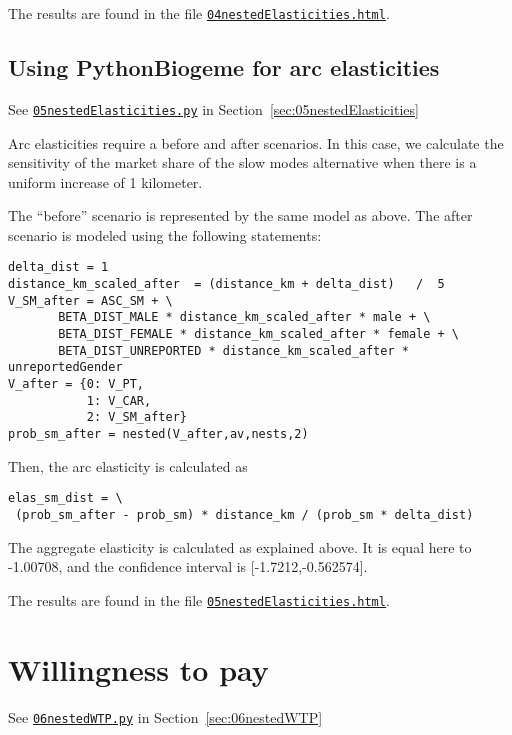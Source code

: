 \documentclass[12pt,a4paper]{article}
\begin{document}
The results are found in the file \href{http://biogeme.epfl.ch/examples/indicators/python/04nestedElasticities.html}{\lstinline$04nestedElasticities.html$}.

\subsection{Using PythonBiogeme for arc elasticities}

\begin{flushright}
See \href{http://biogeme.epfl.ch/examples/indicators/python/05nestedElasticities.py}{\lstinline$05nestedElasticities.py$} in Section~\ref{sec:05nestedElasticities}
\end{flushright}


Arc elasticities require a before and after scenarios. In this case,
we calculate the sensitivity of the market share of the slow modes
alternative when there is a uniform increase of 1 kilometer.

The ``before'' scenario is represented by the same model as above. The
after scenario is modeled using the following statements:
\begin{lstlisting}
delta_dist = 1
distance_km_scaled_after  = (distance_km + delta_dist)   /  5
V_SM_after = ASC_SM + \
       BETA_DIST_MALE * distance_km_scaled_after * male + \
       BETA_DIST_FEMALE * distance_km_scaled_after * female + \
       BETA_DIST_UNREPORTED * distance_km_scaled_after * unreportedGender
V_after = {0: V_PT,
           1: V_CAR,
           2: V_SM_after}
prob_sm_after = nested(V_after,av,nests,2)
\end{lstlisting}
Then, the arc elasticity is calculated as
\begin{lstlisting}
elas_sm_dist = \
 (prob_sm_after - prob_sm) * distance_km / (prob_sm * delta_dist) 
\end{lstlisting}
The aggregate elasticity is calculated as explained above. It is equal
here to
-1.00708, and the confidence interval is [-1.7212,-0.562574].

The results are found in the file \href{http://biogeme.epfl.ch/examples/indicators/python/05nestedElasticities.html}{\lstinline$05nestedElasticities.html$}.

\section{Willingness to pay}

\begin{flushright}
See \href{http://biogeme.epfl.ch/examples/indicators/python/06nestedWTP.py}{\lstinline$06nestedWTP.py$} in Section~\ref{sec:06nestedWTP}
\end{flushright}
\end{document}
